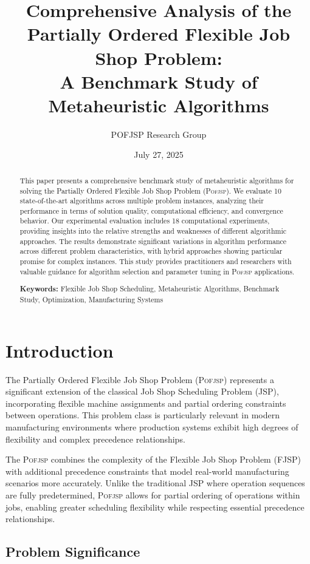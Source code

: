 \documentclass[11pt,a4paper]{article}
\title{Comprehensive Analysis of the Partially Ordered Flexible Job Shop Problem: \\
A Benchmark Study of Metaheuristic Algorithms}
\author{POFJSP Research Group}
\date{July 27, 2025}
\newcommand{\pofjsp}{\textsc{Pofjsp}}
\begin{document}
\maketitle


\begin{abstract}
This paper presents a comprehensive benchmark study of metaheuristic algorithms for solving the Partially Ordered Flexible Job Shop Problem (\pofjsp). We evaluate 10 state-of-the-art algorithms across multiple problem instances, analyzing their performance in terms of solution quality, computational efficiency, and convergence behavior. Our experimental evaluation includes 18 computational experiments, providing insights into the relative strengths and weaknesses of different algorithmic approaches. The results demonstrate significant variations in algorithm performance across different problem characteristics, with hybrid approaches showing particular promise for complex instances. This study provides practitioners and researchers with valuable guidance for algorithm selection and parameter tuning in \pofjsp{} applications.

\textbf{Keywords:} Flexible Job Shop Scheduling, Metaheuristic Algorithms, Benchmark Study, Optimization, Manufacturing Systems
\end{abstract}


\section{Introduction}

The Partially Ordered Flexible Job Shop Problem (\pofjsp) represents a significant extension of the classical Job Shop Scheduling Problem (JSP), incorporating flexible machine assignments and partial ordering constraints between operations. This problem class is particularly relevant in modern manufacturing environments where production systems exhibit high degrees of flexibility and complex precedence relationships.

The \pofjsp{} combines the complexity of the Flexible Job Shop Problem (FJSP) with additional precedence constraints that model real-world manufacturing scenarios more accurately. Unlike the traditional JSP where operation sequences are fully predetermined, \pofjsp{} allows for partial ordering of operations within jobs, enabling greater scheduling flexibility while respecting essential precedence relationships.

\subsection{Problem Significance}
\end{document}
